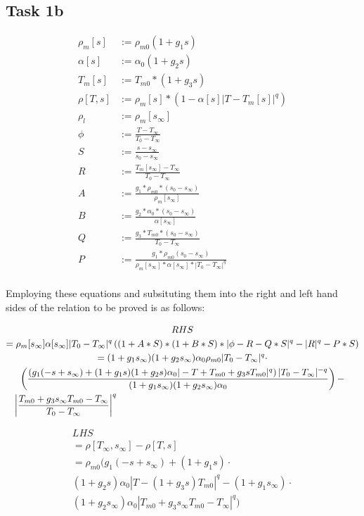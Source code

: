 \documentclass[letterpaper, 10pt]{article}
\begin{document}
	
	\subsection*{Task 1b} %
	\label{ssec:Task 1b}

	\begin{align*}
		\rho_m[s]&:=\rho_{m0}(1+g_1 s)\\
		\alpha[s]&:=\alpha_0(1+g_2 s)\\
		T_m[s]&:=T_{m0}*(1+g_3 s)\\
		\rho[T,s]&:=\rho_m[s]*\left(1-\alpha[s] |T-T_m[s]|^q\right)\\
		\rho_l&:=\rho_m[s_\infty]\\
		\phi&:=\frac{T-T_\infty}{T_0-T_\infty}\\
		S&:=\frac{s-s_\infty}{s_0-s_\infty}\\
		R&:=\frac{T_m[s_\infty]-T_\infty}{T_0-T_\infty}\\
		A&:=\frac{g_1*\rho_{m0}*(s_0-s_\infty)}{\rho_m[s_\infty]}\\
		B&:=\frac{g_2*\alpha_0*(s_0-s_\infty)}{\alpha[s_\infty]}\\
		Q&:=\frac{g_3*T_{m0}*(s_0-s_\infty)}{T_0-T_\infty}\\
		P&:=\frac{g_1*\rho_{m0}(s_0-s_\infty)}{\rho_m[s_\infty]*\alpha[s_\infty]*|T_0-T_\infty|^q}\\
	\end{align*}

	Employing these equations and subsituting them into the right and left hand sides of the relation to be proved is as follows:

	\begin{multline*}
		RHS\\
		= \rho_m[s_\infty] \alpha[s_\infty] |T_0-T_\infty|^q \left((1+A*S)*(1+B*S)*|\phi 	-R-Q*S|^q-|R|^q-P*S\right) \\
		= (1+g_1 s_\infty) (1+g_2 s_\infty) \alpha_0 \rho_{m0} |T_0-T_\infty|^q \cdot \\
		\left(\frac{\left(g_1 (-s+s_\infty)+(1+g_1 s) (1+g_2 s) \alpha_0 |-T+T_{m0}+g_3 s T_{m0}|^q\right)
		|T_0-T_\infty|^{-q}}{(1+g_1 s_\infty) (1+g_2 s_\infty) \alpha_0}\right) -\\ 
		\shoveleft{\left|\frac{T_{m0}+g_3 s_\infty T_{m0}-T_\infty}{T_0-T_\infty}\right|^q}
	\end{multline*}

	\begin{multline*}
		LHS\\
		= \rho[T_\infty,s_\infty]-\rho [T,s]\\ 
		= \rho_{m0} (g_1 (-s+s_\infty)+(1+g_1 s) \cdot \\
		(1+g_2 s) \alpha_0 |T-(1+g_3 s) T_{m0}|^q-(1+g_1 s_\infty) \cdot\\ 
		(1+g_2 s_\infty) \alpha_0 |T_{m0}+g_3 s_\infty T_{m0}-T_\infty|^q)
	\end{multline*}
\end{document}
